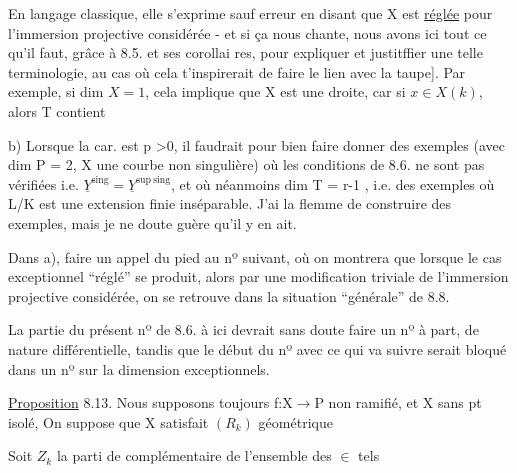 \unsure{\hand{(}}En langage classique, elle s'exprime  sauf erreur en disant
que X est \uline{réglée} pour l'immersion projective considérée \hand{[}- et si ça nous
chante, nous avons ici  tout ce qu'il faut, grâce à 8.5. et ses corollai
res, pour expliquer et justitffier une telle terminologie, au cas où cela
t'inspirerait de faire le lien avec la taupe]. Par exemple, si dim $X=1$, cela implique que X est une droite, car si $x \in X(k)$, alors T contient 

b)  Lorsque la car. est p >0, il faudrait pour bien faire donner
des exemples (avec dim P = 2, X une courbe non singulière) où  les
conditions de 8.6. ne sont pas vérifiées i.e. $\underline{Y}^{\mathrm{sing}} = \underline{Y}^{\mathrm{sup\ sing}}$, et où
néanmoins  dim T = r-1 , i.e. des exemples où  L/K est une extension finie
inséparable.  J'ai la flemme de construire des exemples, mais je ne
doute guère qu'il y en ait.

 Dans a), faire un appel du pied au  nº suivant,
où on montrera que lorsque le cas exceptionnel ``réglé'' se produit, alors 
par une modification triviale de l'immersion projective considérée, on
se retrouve dans la situation  ``générale''  de 8.8.

\placedmargin{\unsure{$\|$}}La partie du présent nº de 8.6. à ici  devrait sans doute faire
un nº à part, de nature différentielle,  tandis que le début du nº avec
ce qui va suivre serait bloqué dans un nº  sur  la dimension 
exceptionnels. 

\uline{Proposition} 8.13.   Nous supposons toujours f:X$\to$P non ramifié, et X sans pt isolé, 
On suppose que X satisfait $(R_k)$ géométrique







  Soit $Z_k$ la parti
de   complémentaire de l'ensemble des \hand{$\xi$}$\in$  tels

